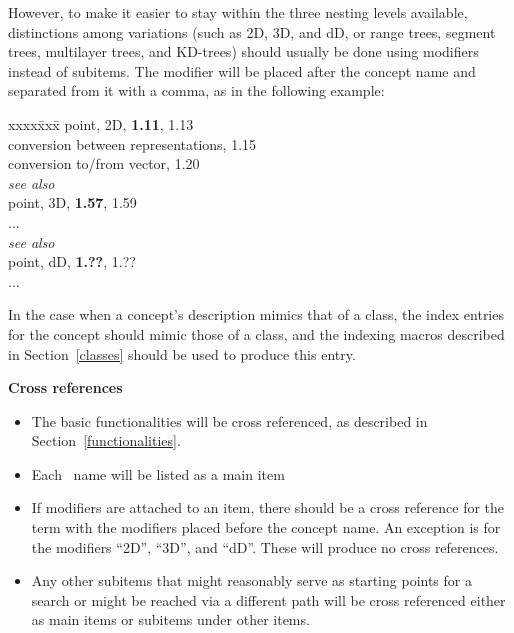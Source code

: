 \documentclass[11pt]{article}
\newenvironment{indexex}{\begin{tabbing}
xxxx\=xxx\=\kill}{\end{tabbing}}
\begin{document}
\begin{description}
        However,
        to make it easier to stay within the three nesting levels available, 
        distinctions among variations (such as
        2D, 3D, and dD, or range trees, segment trees, multilayer trees, 
        and KD-trees) should usually be done using 
        modifiers instead of subitems.  The modifier will be 
        placed after the concept name and separated from it with a comma, as in 
        the following example:
        \begin{indexex}
        point, 2D,                                  {\bf 1.11}, 1.13 \\
        \>  conversion between representations,                  1.15 \\
        \>  conversion to/from vector,                           1.20\\
        \>  {\em see also}                 \\
        point, 3D,                                  {\bf 1.57}, 1.59 \\
        \> ...                                                       \\
        \> {\em see also} \\
        point, dD,                                  {\bf 1.??}, 1.?? \\
        \> ...                                                       \\
        \end{indexex}

        In the case when a concept's description mimics that of a class,
        the index entries for the concept should mimic those of a class, and 
        the indexing macros described in Section~\ref{classes} should be used
        to produce this entry.

   \item{\bf Cross references}

        \begin{itemize}
           \item The basic functionalities will be cross referenced, as 
                 described in Section~\ref{functionalities}.  
           \item Each \CC\ name will be listed as a main item
           \item If modifiers are attached to an item, there should
                 be a cross reference for the term with the modifiers placed
                 before the concept name.   An exception is 
                 for the modifiers ``2D'', ``3D'', and ``dD''.  These will 
                 produce no cross references.
           \item Any other subitems that might reasonably serve as starting 
                 points 
                 for a search or might be reached via a different path will
                 be cross referenced either as main items or subitems under
                 other items.
        \end{itemize}


\end{description}
\end{document}
